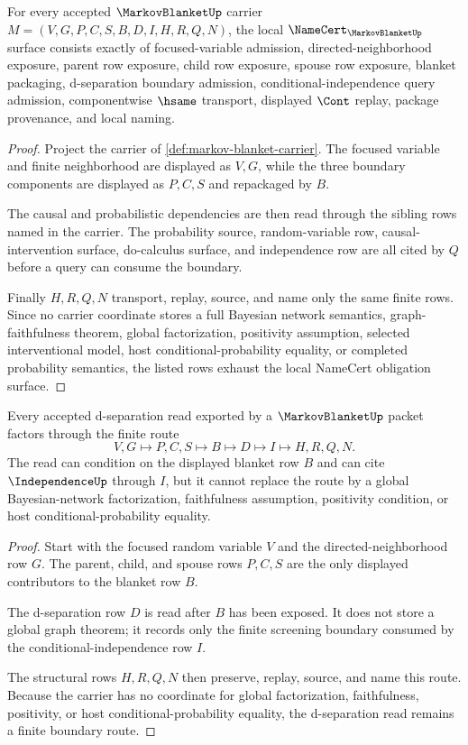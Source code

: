 \begin{theorem}
\label{thm:markov-blanket-namecert-obligations}
For every accepted $\MarkovBlanketUp$ carrier $M=(V,G,P,C,S,B,D,I,H,R,Q,N)$, the local $\NameCert_{\MarkovBlanketUp}$ surface consists exactly of focused-variable admission, directed-neighborhood exposure, parent row exposure, child row exposure, spouse row exposure, blanket packaging, d-separation boundary admission, conditional-independence query admission, componentwise $\hsame$ transport, displayed $\Cont$ replay, package provenance, and local naming.
\end{theorem}
\begin{proof}
Project the carrier of \autoref{def:markov-blanket-carrier}. The focused variable and finite neighborhood are displayed as $V,G$, while the three boundary components are displayed as $P,C,S$ and repackaged by $B$.

The causal and probabilistic dependencies are then read through the sibling rows named in the carrier. The probability source, random-variable row, causal-intervention surface, do-calculus surface, and independence row are all cited by $Q$ before a query can consume the boundary.

Finally $H,R,Q,N$ transport, replay, source, and name only the same finite rows. Since no carrier coordinate stores a full Bayesian network semantics, graph-faithfulness theorem, global factorization, positivity assumption, selected interventional model, host conditional-probability equality, or completed probability semantics, the listed rows exhaust the local NameCert obligation surface.
\end{proof}

\begin{theorem}
\label{thm:markov-blanket-d-separation-boundary}
Every accepted d-separation read exported by a $\MarkovBlanketUp$ packet factors through the finite route
$$
V,G\longmapsto P,C,S\longmapsto B\longmapsto D\longmapsto I\longmapsto H,R,Q,N .
$$
The read can condition on the displayed blanket row $B$ and can cite $\IndependenceUp$ through $I$, but it cannot replace the route by a global Bayesian-network factorization, faithfulness assumption, positivity condition, or host conditional-probability equality.
\end{theorem}
\begin{proof}
Start with the focused random variable $V$ and the directed-neighborhood row $G$. The parent, child, and spouse rows $P,C,S$ are the only displayed contributors to the blanket row $B$.

The d-separation row $D$ is read after $B$ has been exposed. It does not store a global graph theorem; it records only the finite screening boundary consumed by the conditional-independence row $I$.

The structural rows $H,R,Q,N$ then preserve, replay, source, and name this route. Because the carrier has no coordinate for global factorization, faithfulness, positivity, or host conditional-probability equality, the d-separation read remains a finite boundary route.
\end{proof}

